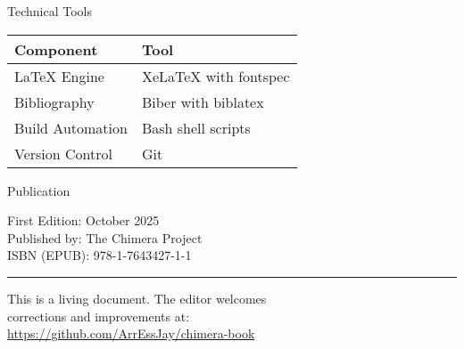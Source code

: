 \begin{center}
\vspace{2cm}

{\lorettamedium\large Technical Tools}

\vspace{0.8cm}

\begin{tabular}{@{}ll@{}}
\toprule
\tableheaderfont Component & \tableheaderfont Tool \\
\midrule
\LaTeX{} Engine & Xe\LaTeX{} with fontspec \\
Bibliography & Biber with biblatex \\
Build Automation & Bash shell scripts \\
Version Control & Git \\
\bottomrule
\end{tabular}

\vspace{2cm}

{\lorettamedium\large Publication}

\vspace{0.8cm}

First Edition: October 2025\\
Published by: The Chimera Project\\
ISBN (EPUB): 978-1-7643427-1-1

\vspace{2cm}

\rule{0.5\textwidth}{0.4pt}

\vspace{1cm}

This is a living document. The editor welcomes\\
corrections and improvements at:\\[0.5em]
\url{https://github.com/ArrEssJay/chimera-book}

\vspace{1.5cm}

\end{center}
